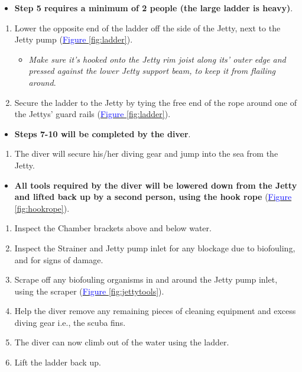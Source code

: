 \documentclass[
  12pt,
]{report}
\providecommand{\tightlist}{%
  \setlength{\itemsep}{0pt}\setlength{\parskip}{0pt}}\usepackage{longtable,booktabs,array}
\begin{document}
\begin{itemize}
\tightlist
\item
  \textbf{Step 5 requires a minimum of 2 people (the large ladder is
  heavy)}.
\end{itemize}

\begin{enumerate}
\def\labelenumi{\arabic{enumi}.}
\setcounter{enumi}{4}
\tightlist
\item
  Lower the opposite end of the ladder off the side of the Jetty, next
  to the Jetty pump (\ul{\textcolor{blue}{Figure \ref{fig:ladder}}}).

  \begin{itemize}
  \tightlist
  \item
    \emph{Make sure it's hooked onto the Jetty rim joist along its'
    outer edge and pressed against the lower Jetty support beam, to keep
    it from flailing around}.
  \end{itemize}
\item
  Secure the ladder to the Jetty by tying the free end of the rope
  around one of the Jettys' guard rails
  (\ul{\textcolor{blue}{Figure \ref{fig:ladder}}}).
\end{enumerate}

\begin{itemize}
\tightlist
\item
  \textbf{Steps 7-10 will be completed by the diver}.
\end{itemize}

\begin{enumerate}
\def\labelenumi{\arabic{enumi}.}
\setcounter{enumi}{6}
\tightlist
\item
  The diver will secure his/her diving gear and jump into the sea from
  the Jetty.
\end{enumerate}

\begin{itemize}
\tightlist
\item
  \textbf{All tools required by the diver will be lowered down from the
  Jetty and lifted back up by a second person, using the hook rope}
  (\ul{\textcolor{blue}{Figure \ref{fig:hookrope}}}).
\end{itemize}

\begin{enumerate}
\def\labelenumi{\arabic{enumi}.}
\setcounter{enumi}{7}
\tightlist
\item
  Inspect the Chamber brackets above and below water.
\item
  Inspect the Strainer and Jetty pump inlet for any blockage due to
  biofouling, and for signs of damage.
\item
  Scrape off any biofouling organisms in and around the Jetty pump
  inlet, using the scraper
  (\ul{\textcolor{blue}{Figure \ref{fig:jettytools}}}).
\item
  Help the diver remove any remaining pieces of cleaning equipment and
  excess diving gear i.e., the scuba fins.
\item
  The diver can now climb out of the water using the ladder.
\item
  Lift the ladder back up.
\end{enumerate}
\end{document}
